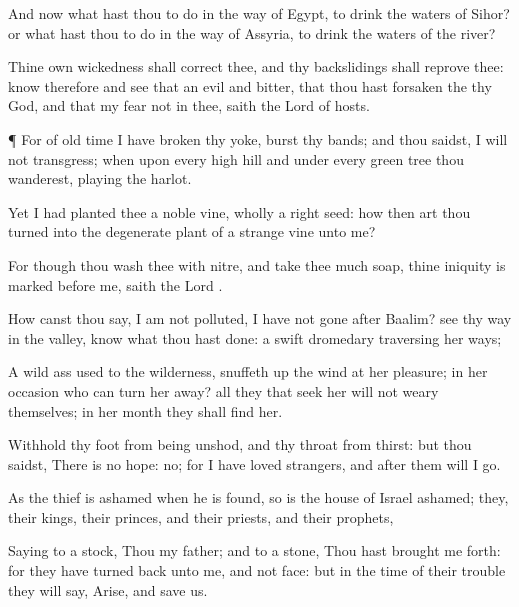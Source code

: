 {And now what hast thou to do in the
way of
Egypt, to
drink the
waters of
Sihor? or what hast thou to do in the
way of
Assyria, to
drink the
waters of the
river?

Thine own
wickedness shall
correct thee, and thy
backslidings shall
reprove thee:
know therefore and
see that
{} an
evil
{} and
bitter, that thou hast
forsaken the
{} thy
God, and that my
fear
{} not in thee,
saith the
Lord
{} of
hosts.


\par }{\PP {}¶ For of old
time I have
broken thy
yoke,
{}
burst thy
bands; and thou
saidst, I will not
transgress; when upon every
high
hill and under every
green
tree thou
wanderest, playing the
harlot.

Yet I had
planted thee a noble
vine, wholly a
right
seed: how then art thou
turned into the degenerate
plant of a
strange
vine unto me?

For though thou
wash thee with
nitre, and take thee
much
soap,
{} thine
iniquity is
marked
before me,
saith the
Lord
{}.

How canst thou
say, I am not
polluted, I have not
gone
after
Baalim?
see thy
way in the
valley,
know what thou hast
done:
{} a
swift
dromedary
traversing her
ways;

A wild
ass
used to the
wilderness,
{} snuffeth
up the
wind at her
pleasure; in her
occasion who can turn her
away? all they that
seek her will not
weary themselves; in her
month they shall
find her.

Withhold thy
foot from being
unshod, and thy
throat from
thirst: but thou
saidst, There is no
hope: no; for I have
loved
strangers, and
after them will I
go.

As the
thief is
ashamed when he is
found, so is the
house of
Israel
ashamed; they, their
kings, their
princes, and their
priests, and their
prophets,

Saying to a
stock, Thou
{} my
father; and to a
stone, Thou hast brought me
forth: for they have
turned
{}
back unto me, and not
{}
face: but in the
time of their
trouble they will
say,
Arise, and
save us.

}
